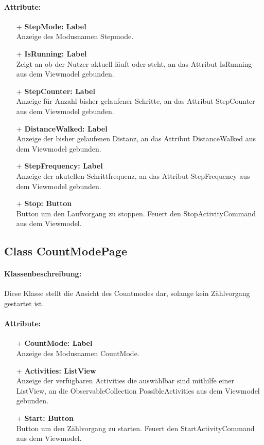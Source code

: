 \documentclass[a4paper,12pt]{article}
\begin{document}
\paragraph{Attribute:}
	\begin{itemize}
	\item[+] \textbf{StepMode: Label} \\ Anzeige des Modusnamen Stepmode.
	\item[+] \textbf{IsRunning: Label} \\ Zeigt an ob der Nutzer aktuell läuft oder steht, an das Attribut IsRunning aus dem Viewmodel gebunden.
	\item[+] \textbf{StepCounter: Label} \\ Anzeige für Anzahl bisher gelaufener Schritte, an das Attribut StepCounter aus dem Viewmodel gebunden.
	\item[+] \textbf{DistanceWalked: Label} \\ Anzeige der bisher gelaufenen Distanz, an das Attribut DistanceWalked aus dem Viewmodel gebunden.
	\item[+] \textbf{StepFrequency: Label} \\ Anzeige der akutellen Schrittfrequenz, an das Attribut StepFrequency aus dem Viewmodel gebunden.
	\item[+] \textbf{Stop: Button} \\ Button um den Laufvorgang zu stoppen. Feuert den StopActivityCommand aus dem Viewmodel.
	\end{itemize}
	
\subsection{Class CountModePage}
\paragraph{Klassenbeschreibung:}
Diese Klasse stellt die Ansicht des Countmodes dar, solange kein Zählvorgang gestartet ist.
\paragraph{Attribute:}
	\begin{itemize}
	\item[+] \textbf{CountMode: Label} \\ Anzeige des Modusnamen CountMode.
	\item[+] \textbf{Activities: ListView} \\ Anzeige der verfügbaren Activities die auswählbar sind mithilfe einer ListView, an die ObservableCollection PossibleActivities aus dem Viewmodel gebunden.
	\item[+] \textbf{Start: Button} \\ Button um den Zählvorgang zu starten. Feuert den StartActivityCommand aus dem Viewmodel.
	\end{itemize}
\end{document}
